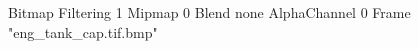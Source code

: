 {Bitmap
	{Filtering 1}
	{Mipmap 0}
	{Blend none}
	{AlphaChannel 0}
	{Frame "eng_tank_cap.tif.bmp"}
}
